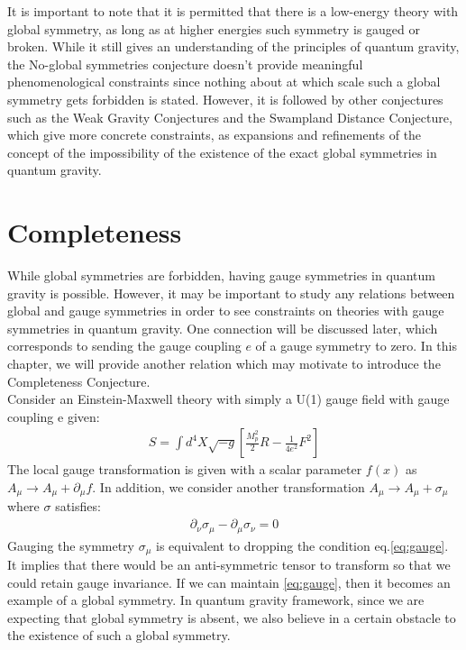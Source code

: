 \indent It is important to note that it is permitted that there is a low-energy theory with global symmetry, as long as at higher energies such symmetry is gauged or broken. While it still gives an understanding of the principles of quantum gravity, the No-global symmetries conjecture doesn't provide meaningful phenomenological constraints since nothing about at which scale such a global symmetry gets forbidden is stated. However, it is followed by other conjectures such as the Weak Gravity Conjectures and the Swampland Distance Conjecture, which give more concrete constraints, as expansions and refinements of the concept of the impossibility of the existence of the exact global symmetries in quantum gravity. 

\section{Completeness}
While global symmetries are forbidden, having gauge symmetries in quantum gravity is possible. However, it may be important to study any relations between global and gauge symmetries in order to see constraints on theories with gauge symmetries in quantum gravity. One connection will be discussed later, which corresponds to sending the gauge coupling $e$ of a gauge symmetry to zero. In this chapter, we will provide another relation which may motivate to introduce the Completeness Conjecture. \\
\indent Consider an Einstein-Maxwell theory with simply a U(1) gauge field with gauge coupling e given:
\begin{align}
    S = \int d^{4}X \sqrt{-g}[\frac{M_{p}^{2}}{2}R - \frac{1}{4e^{2}} F^{2}]
\end{align}
The local gauge transformation is given with a scalar parameter $f(x)$ as $A_{\mu} \rightarrow A_{\mu} + \partial _{\mu} f$. In addition, we consider another transformation $A_{\mu} \rightarrow A_{\mu} + \sigma _{\mu}$ where $\sigma$ satisfies:
\begin{align}
    \label{eq:gauge}
    \partial _{\nu} \sigma _{\mu} - \partial _{\mu} \sigma _{\nu} =0
\end{align}
Gauging the symmetry $\sigma _{\mu}$ is equivalent to dropping the condition eq.\ref{eq:gauge}. It implies that there would be an anti-symmetric tensor to transform so that we could retain gauge invariance. If we can maintain \ref{eq:gauge}, then it becomes an example of a global symmetry. In quantum gravity framework, since we are expecting that global symmetry is absent, we also believe in a certain obstacle to the existence of such a global symmetry. \\
